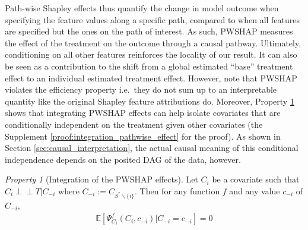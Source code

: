 \documentclass{article}
\theoremstyle{plain}
\theoremstyle{definition}
\theoremstyle{remark}
\newcommand{\effect}{\Psi}
\theoremstyle{mystyle}
\newtheorem{property}{Property}[section]
\newcommand{\indep}{\perp\!\!\!\!\perp}
\begin{document}
 
Path-wise Shapley effects thus quantify the change in model outcome when specifying the feature values along a specific path, compared to when all features are specified but the ones on the path of interest. As such, PWSHAP measures the effect of the treatment on the outcome through a causal pathway. Ultimately, conditioning on all other features reinforces the locality of our result. 
 It can also be seen as a contribution to the shift from a global estimated ``base'' treatment effect to an individual estimated treatment effect.
 However, note that PWSHAP violates the efficiency property i.e.\ they do not sum up to an interpretable quantity like the original Shapley feature attributions do. %
Moreover, Property \ref{prop:integration_pathwise_effect} shows that integrating PWSHAP effects can help isolate covariates that are conditionally independent on the treatment given other covariates (the Supplement \ref{proof:integration_pathwise_effect} for the proof). As shown in Section \ref{sec:causal_interpretation}, the actual causal meaning of this conditional independence depends on the posited DAG of the data, however.
\begin{property}[Integration of the PWSHAP effects] \label{prop:integration_pathwise_effect} 
Let $C_i$ be a covariate such that $C_i \indep T | C_{-i}$ where  $C_{-i} := C_{S^* \backslash \{i\}}$. Then for any function $f$ and any value $c_{-i}$ of $C_{-i}$, 
\begin{align*}
\mathbb{E}[\effect^f_{C_i}(C_i, c_{-i}) | C_{-i} = c_{-i} ] = 0
\end{align*}
\end{property}
\vspace*{-0.5cm}
\end{document}
